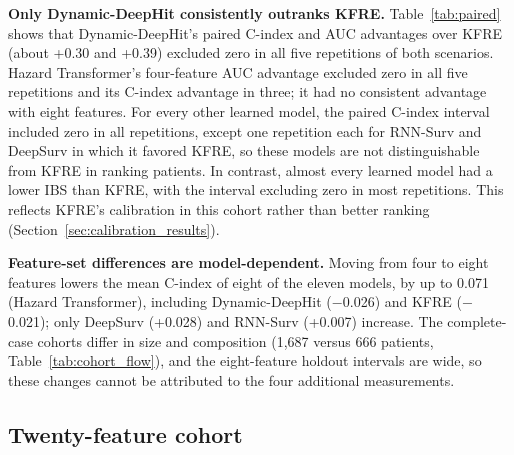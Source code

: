 \textbf{Only Dynamic-DeepHit consistently outranks KFRE.} Table~\ref{tab:paired} shows that Dynamic-DeepHit's paired C-index and AUC advantages over KFRE (about +0.30 and +0.39) excluded zero in all five repetitions of both scenarios. Hazard Transformer's four-feature AUC advantage excluded zero in all five repetitions and its C-index advantage in three; it had no consistent advantage with eight features. For every other learned model, the paired C-index interval included zero in all repetitions, except one repetition each for RNN-Surv and DeepSurv in which it favored KFRE, so these models are not distinguishable from KFRE in ranking patients. In contrast, almost every learned model had a lower IBS than KFRE, with the interval excluding zero in most repetitions. This reflects KFRE's calibration in this cohort rather than better ranking (Section~\ref{sec:calibration_results}).

\textbf{Feature-set differences are model-dependent.} Moving from four to eight features lowers the mean C-index of eight of the eleven models, by up to 0.071 (Hazard Transformer), including Dynamic-DeepHit ($-$0.026) and KFRE ($-$0.021); only DeepSurv (+0.028) and RNN-Surv (+0.007) increase. The complete-case cohorts differ in size and composition (1{,}687 versus 666 patients, Table~\ref{tab:cohort_flow}), and the eight-feature holdout intervals are wide, so these changes cannot be attributed to the four additional measurements.

\subsection{Twenty-feature cohort}

